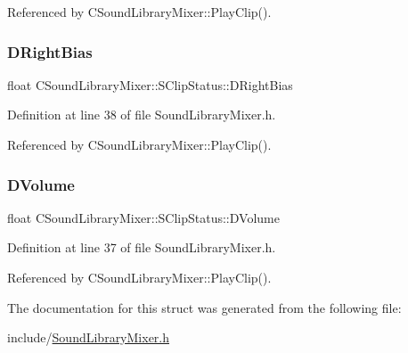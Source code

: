 Referenced by C\+Sound\+Library\+Mixer\+::\+Play\+Clip().

\hypertarget{structCSoundLibraryMixer_1_1SClipStatus_a260c67e2b8881a674e4ebbffbdba6194}{}\label{structCSoundLibraryMixer_1_1SClipStatus_a260c67e2b8881a674e4ebbffbdba6194} 
\subsubsection{\texorpdfstring{D\+Right\+Bias}{DRightBias}}
{\footnotesize\ttfamily float C\+Sound\+Library\+Mixer\+::\+S\+Clip\+Status\+::\+D\+Right\+Bias}



Definition at line 38 of file Sound\+Library\+Mixer.\+h.



Referenced by C\+Sound\+Library\+Mixer\+::\+Play\+Clip().

\hypertarget{structCSoundLibraryMixer_1_1SClipStatus_a2f44b601fef18f411ec68fb0da7ee1cf}{}\label{structCSoundLibraryMixer_1_1SClipStatus_a2f44b601fef18f411ec68fb0da7ee1cf} 
\subsubsection{\texorpdfstring{D\+Volume}{DVolume}}
{\footnotesize\ttfamily float C\+Sound\+Library\+Mixer\+::\+S\+Clip\+Status\+::\+D\+Volume}



Definition at line 37 of file Sound\+Library\+Mixer.\+h.



Referenced by C\+Sound\+Library\+Mixer\+::\+Play\+Clip().



The documentation for this struct was generated from the following file\+:\begin{DoxyCompactItemize}
\item 
include/\hyperlink{SoundLibraryMixer_8h}{Sound\+Library\+Mixer.\+h}\end{DoxyCompactItemize}
